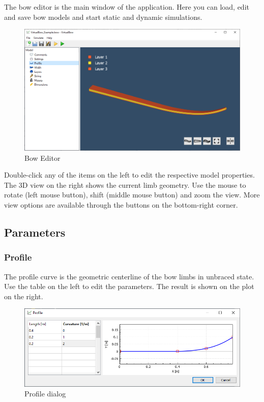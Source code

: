 \documentclass[12pt]{article}
\begin{document}
The bow editor is the main window of the application. Here you can load, edit and save bow models and start static and dynamic simulations.

\begin{figure}[H]
\centering
\includegraphics[width=\textwidth]{figures/screenshots/input/bow-editor}
\caption{Bow Editor}
\label{fig:bow-editor}
\end{figure}

Double-click any of the items on the left to edit the respective model properties. The 3D view on the right shows the current limb geometry.
Use the mouse to rotate (left mouse button), shift (middle mouse button) and zoom the view.
More view options are available through the buttons on the bottom-right corner.

\newpage
\subsection{Parameters}

\newpage
\subsubsection{Profile}

The profile curve is the geometric centerline of the bow limbs in unbraced state.
Use the table on the left to edit the parameters.
The result is shown on the plot on the right.

\begin{figure}[H]
\centering
\includegraphics[width=\textwidth]{figures/screenshots/input/profile}
\caption{Profile dialog}
\label{fig:profile}
\end{figure}
\end{document}
